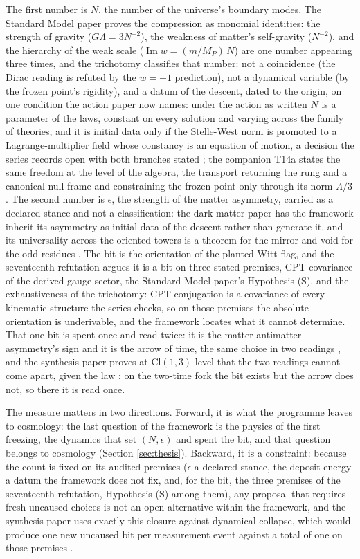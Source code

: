 \documentclass[11pt]{article}
\theoremstyle{definition}
\newcommand{\Cl}{\mathrm{Cl}}
\begin{document}
The first number is $N$, the number of the universe's boundary modes. The Standard Model paper proves the compression as monomial identities: the strength of gravity ($G\Lambda = 3N^{-2}$), the weakness of matter's self-gravity ($N^{-2}$), and the hierarchy of the weak scale ($\operatorname{Im} w = (m/M_{P})\,N$) are one number appearing three times, and the trichotomy classifies that number: not a coincidence (the Dirac reading is refuted by the $w = -1$ prediction), not a dynamical variable (by the frozen point's rigidity), and a datum of the descent, dated to the origin, on one condition the action paper now names: under the action as written $N$ is a parameter of the laws, constant on every solution and varying across the family of theories, and it is initial data only if the Stelle-West norm is promoted to a Lagrange-multiplier field whose constancy is an equation of motion, a decision the series records open with both branches stated \cite{ButlerT12, ButlerT10}; the companion T14a \cite{ButlerT14a} states the same freedom at the level of the algebra, the transport returning the rung and a canonical null frame and constraining the frozen point only through its norm $\Lambda/3$. The second number is $\epsilon$, the strength of the matter asymmetry, carried as a declared stance and not a classification: the dark-matter paper has the framework inherit its asymmetry as initial data of the descent rather than generate it, and its universality across the oriented towers is a theorem for the mirror and void for the odd residues \cite{ButlerT14}. The bit is the orientation of the planted Witt flag, and the seventeenth refutation argues it is a bit on three stated premises, CPT covariance of the derived gauge sector, the Standard-Model paper's Hypothesis (S), and the exhaustiveness of the trichotomy: CPT conjugation is a covariance of every kinematic structure the series checks, so on those premises the absolute orientation is underivable, and the framework locates what it cannot determine. That one bit is spent once and read twice: it is the matter-antimatter asymmetry's sign and it is the arrow of time, the same choice in two readings \cite{ButlerT14}, and the synthesis paper proves at $\Cl(1,3)$ level that the two readings cannot come apart, given the law \cite{ButlerT16}; on the two-time fork the bit exists but the arrow does not, so there it is read once.

The measure matters in two directions. Forward, it is what the programme leaves to cosmology: the last question of the framework is the physics of the first freezing, the dynamics that set $(N, \epsilon)$ and spent the bit, and that question belongs to cosmology (Section \ref{sec:thesis}). Backward, it is a constraint: because the count is fixed on its audited premises ($\epsilon$ a declared stance, the deposit energy a datum the framework does not fix, and, for the bit, the three premises of the seventeenth refutation, Hypothesis (S) among them), any proposal that requires fresh uncaused choices is not an open alternative within the framework, and the synthesis paper uses exactly this closure against dynamical collapse, which would produce one new uncaused bit per measurement event against a total of one on those premises \cite{ButlerT16}.
\end{document}
